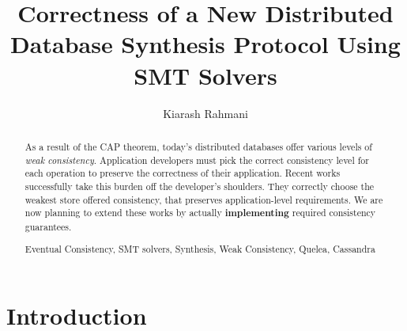 \documentclass[runningheads]{llncs}
\newcommand{\keywords}[1]{\par\addvspace\baselineskip
\noindent\keywordname\enspace\ignorespaces#1}
\begin{document}
\mainmatter  %

\title{Correctness of a New Distributed Database Synthesis Protocol Using SMT Solvers}

\titlerunning{}

%
%

\author{Kiarash Rahmani}
%



%
%

\maketitle


\begin{abstract}
As a result of the CAP theorem, today's distributed databases offer various levels of \emph{weak consistency}. Application developers must pick the correct consistency level for each operation to preserve the correctness of their application. Recent  works\cite{quelea} successfully take this burden off the developer's shoulders. They correctly choose the weakest store offered consistency, that preserves application-level requirements. We are now planning to extend these works by actually {\bf implementing} required consistency guarantees.

\keywords{Eventual Consistency, SMT solvers, Synthesis, Weak Consistency, Quelea, Cassandra }
\end{abstract}

\section{Introduction}
\end{document}
